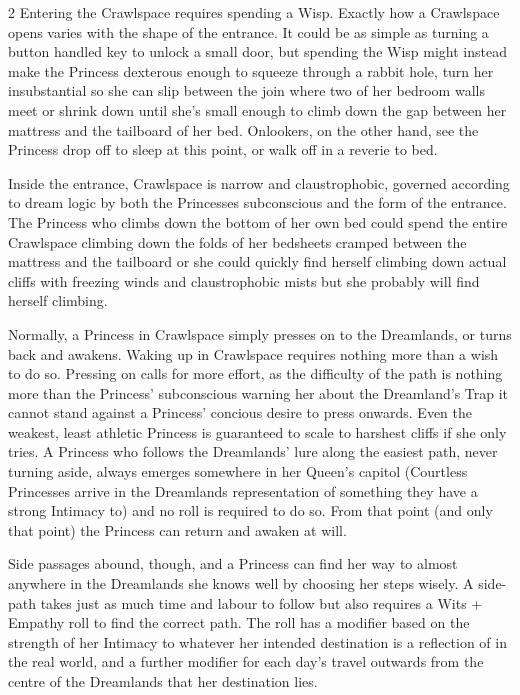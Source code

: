 \begin{multicols}{2}
Entering the Crawlspace requires spending a Wisp. Exactly how a Crawlspace opens varies with the shape of the entrance. It could be as simple as turning a button handled key to unlock a small door, but spending the Wisp might instead make the Princess dexterous enough to squeeze through a rabbit hole, turn her insubstantial so she can slip between the join where two of her bedroom walls meet or shrink down until she's small enough to climb down the gap between her mattress and the tailboard of her bed. Onlookers, on the other hand, see the Princess drop off to sleep at this point, or walk off in a reverie to bed.

Inside the entrance, Crawlspace is narrow and claustrophobic, governed according to dream logic by both the Princesses subconscious and the form of the entrance. The Princess who climbs down the bottom of her own bed could spend the entire Crawlspace climbing down the folds of her bedsheets cramped between the mattress and the tailboard or she could quickly find herself climbing down actual cliffs with freezing winds and claustrophobic mists but she probably will find herself climbing.

Normally, a Princess in Crawlspace simply presses on to the Dreamlands, or turns back and awakens. Waking up in Crawlspace requires nothing more than a wish to do so. Pressing on calls for more effort, as the difficulty of the path is nothing more than the Princess' subconscious warning her about the Dreamland's Trap it cannot stand against a Princess' concious desire to press onwards. Even the weakest, least athletic Princess is guaranteed to scale to harshest cliffs if she only tries. A Princess who follows the Dreamlands' lure along the easiest path, never turning aside, always emerges somewhere in her Queen's capitol (Courtless Princesses arrive in the Dreamlands representation of something they have a strong Intimacy to) and no roll is required to do so. From that point (and only that point) the Princess can return and awaken at will. 

Side passages abound, though, and a Princess can find her way to almost anywhere in the Dreamlands she knows well by choosing her steps wisely. A side-path takes just as much time and labour to follow but also requires a Wits + Empathy roll to find the correct path. The roll has a modifier based on the strength of her Intimacy to whatever her intended destination is a reflection of in the real world, and a further modifier for each day's travel outwards from the centre of the Dreamlands that her destination lies.


\end{multicols}
